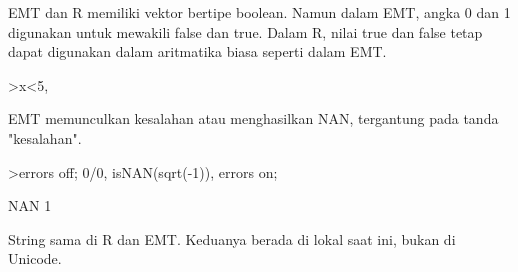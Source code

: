 \documentclass[a4paper,10pt]{article}
\begin{document}
\begin{eulernotebook}
\begin{eulercomment}
\begin{eulercomment}
\begin{eulercomment}
\begin{eulercomment}
\begin{eulercomment}
\begin{eulercomment}
\begin{eulercomment}
\begin{eulercomment}
\begin{eulercomment}
\begin{eulercomment}
\begin{eulercomment}
\begin{eulercomment}
\begin{eulercomment}
\begin{eulercomment}
\begin{eulercomment}
\begin{eulercomment}
\begin{eulercomment}
\begin{eulercomment}
\begin{eulercomment}
\begin{eulercomment}
\begin{eulercomment}
\begin{eulercomment}
\begin{eulercomment}
\begin{eulercomment}
\begin{eulercomment}
\begin{eulercomment}
\begin{eulercomment}
\begin{eulercomment}
\begin{eulercomment}
\begin{eulercomment}
\begin{eulercomment}
\begin{eulercomment}
\begin{eulercomment}
\begin{eulercomment}
\begin{eulercomment}
EMT dan R memiliki vektor bertipe boolean. Namun dalam EMT, angka 0
dan 1 digunakan untuk mewakili false dan true. Dalam R, nilai true dan
false tetap dapat digunakan dalam aritmatika biasa seperti dalam EMT.
\end{eulercomment}
\begin{eulerprompt}
>x<5, %
\end{eulerprompt}
\begin{euleroutput}
  [0,  0,  1,  0,  0]
  [0,  0,  3.1,  0,  0]
\end{euleroutput}
\begin{eulercomment}
EMT memunculkan kesalahan atau menghasilkan NAN, tergantung pada tanda
"kesalahan".
\end{eulercomment}
\begin{eulerprompt}
>errors off; 0/0, isNAN(sqrt(-1)), errors on;
\end{eulerprompt}
\begin{euleroutput}
  NAN
  1
\end{euleroutput}
\begin{eulercomment}
String sama di R dan EMT. Keduanya berada di lokal saat ini, bukan di
Unicode.


\end{eulercomment}
\end{eulercomment}
\end{eulercomment}
\end{eulercomment}
\end{eulercomment}
\end{eulercomment}
\end{eulercomment}
\end{eulercomment}
\end{eulercomment}
\end{eulercomment}
\end{eulercomment}
\end{eulercomment}
\end{eulercomment}
\end{eulercomment}
\end{eulercomment}
\end{eulercomment}
\end{eulercomment}
\end{eulercomment}
\end{eulercomment}
\end{eulercomment}
\end{eulercomment}
\end{eulercomment}
\end{eulercomment}
\end{eulercomment}
\end{eulercomment}
\end{eulercomment}
\end{eulercomment}
\end{eulercomment}
\end{eulercomment}
\end{eulercomment}
\end{eulercomment}
\end{eulercomment}
\end{eulercomment}
\end{eulercomment}
\end{eulercomment}
\end{eulernotebook}
\end{document}
